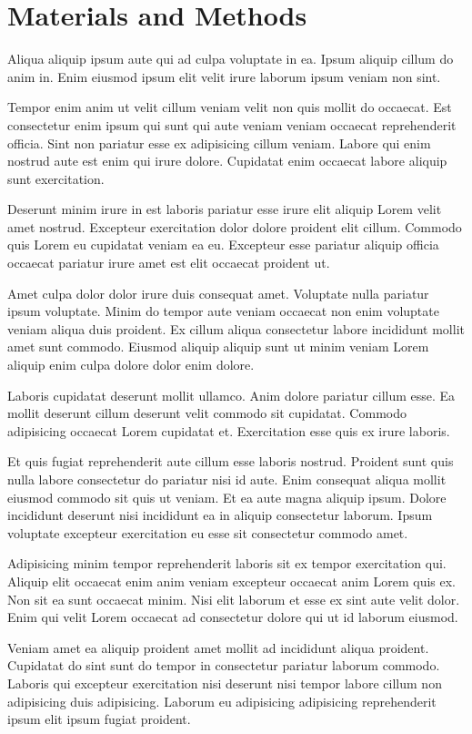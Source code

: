 
\section{Materials and Methods}
\label{sec.mat_method_simple}

Aliqua aliquip ipsum aute qui ad culpa voluptate in ea. Ipsum aliquip cillum do anim in. Enim eiusmod ipsum elit velit irure laborum ipsum veniam non sint.

Tempor enim anim ut velit cillum veniam velit non quis mollit do occaecat. Est consectetur enim ipsum qui sunt qui aute veniam veniam occaecat reprehenderit officia. Sint non pariatur esse ex adipisicing cillum veniam. Labore qui enim nostrud aute est enim qui irure dolore. Cupidatat enim occaecat labore aliquip sunt exercitation.

Deserunt minim irure in est laboris pariatur esse irure elit aliquip Lorem velit amet nostrud. Excepteur exercitation dolor dolore proident elit cillum. Commodo quis Lorem eu cupidatat veniam ea eu. Excepteur esse pariatur aliquip officia occaecat pariatur irure amet est elit occaecat proident ut.

Amet culpa dolor dolor irure duis consequat amet. Voluptate nulla pariatur ipsum voluptate. Minim do tempor aute veniam occaecat non enim voluptate veniam aliqua duis proident. Ex cillum aliqua consectetur labore incididunt mollit amet sunt commodo. Eiusmod aliquip aliquip sunt ut minim veniam Lorem aliquip enim culpa dolore dolor enim dolore.

Laboris cupidatat deserunt mollit ullamco. Anim dolore pariatur cillum esse. Ea mollit deserunt cillum deserunt velit commodo sit cupidatat. Commodo adipisicing occaecat Lorem cupidatat et. Exercitation esse quis ex irure laboris.

Et quis fugiat reprehenderit aute cillum esse laboris nostrud. Proident sunt quis nulla labore consectetur do pariatur nisi id aute. Enim consequat aliqua mollit eiusmod commodo sit quis ut veniam. Et ea aute magna aliquip ipsum. Dolore incididunt deserunt nisi incididunt ea in aliquip consectetur laborum. Ipsum voluptate excepteur exercitation eu esse sit consectetur commodo amet.

Adipisicing minim tempor reprehenderit laboris sit ex tempor exercitation qui. Aliquip elit occaecat enim anim veniam excepteur occaecat anim Lorem quis ex. Non sit ea sunt occaecat minim. Nisi elit laborum et esse ex sint aute velit dolor. Enim qui velit Lorem occaecat ad consectetur dolore qui ut id laborum eiusmod.

Veniam amet ea aliquip proident amet mollit ad incididunt aliqua proident. Cupidatat do sint sunt do tempor in consectetur pariatur laborum commodo. Laboris qui excepteur exercitation nisi deserunt nisi tempor labore cillum non adipisicing duis adipisicing. Laborum eu adipisicing adipisicing reprehenderit ipsum elit ipsum fugiat proident.